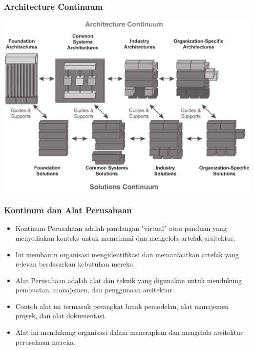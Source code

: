 \documentclass{beamer}
\begin{document}
	{
		\begin{frame}
			\frametitle{Architecture Continuum}
			\begin{center}
				\includegraphics[width=.95\textwidth]{../figures/enterprise_continuum}
			\end{center}
		\end{frame}
	}

	\begin{frame}
		\frametitle{Kontinum dan Alat Perusahaan}
		\begin{itemize}
			\item Kontinum Perusahaan adalah pandangan "virtual" atau panduan yang menyediakan konteks untuk memahami dan mengelola artefak arsitektur.
			\item Ini membantu organisasi mengidentifikasi dan memanfaatkan artefak yang relevan berdasarkan kebutuhan mereka.
			\item Alat Perusahaan adalah alat dan teknik yang digunakan untuk mendukung pembuatan, manajemen, dan penggunaan arsitektur.
			\item Contoh alat ini termasuk perangkat lunak pemodelan, alat manajemen proyek, dan alat dokumentasi.
			\item Alat ini mendukung organisasi dalam menerapkan dan mengelola arsitektur perusahaan mereka.
		\end{itemize}
	\end{frame}
\end{document}
